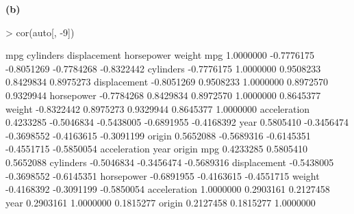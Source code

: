 \documentclass[a4paper]{article}
\renewcommand{\part}[1] {\vspace{.10in} {\bf (#1)}}
\begin{document}
\part{b}
\begin{Schunk}
\begin{Sinput}
> cor(auto[, -9])
\end{Sinput}
\begin{Soutput}
                    mpg  cylinders displacement horsepower     weight
mpg           1.0000000 -0.7776175   -0.8051269 -0.7784268 -0.8322442
cylinders    -0.7776175  1.0000000    0.9508233  0.8429834  0.8975273
displacement -0.8051269  0.9508233    1.0000000  0.8972570  0.9329944
horsepower   -0.7784268  0.8429834    0.8972570  1.0000000  0.8645377
weight       -0.8322442  0.8975273    0.9329944  0.8645377  1.0000000
acceleration  0.4233285 -0.5046834   -0.5438005 -0.6891955 -0.4168392
year          0.5805410 -0.3456474   -0.3698552 -0.4163615 -0.3091199
origin        0.5652088 -0.5689316   -0.6145351 -0.4551715 -0.5850054
             acceleration       year     origin
mpg             0.4233285  0.5805410  0.5652088
cylinders      -0.5046834 -0.3456474 -0.5689316
displacement   -0.5438005 -0.3698552 -0.6145351
horsepower     -0.6891955 -0.4163615 -0.4551715
weight         -0.4168392 -0.3091199 -0.5850054
acceleration    1.0000000  0.2903161  0.2127458
year            0.2903161  1.0000000  0.1815277
origin          0.2127458  0.1815277  1.0000000
\end{Soutput}
\end{Schunk}
\end{document}
